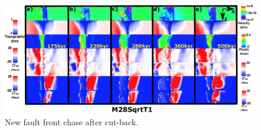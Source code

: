 
\begin{figure}[h]
  \centering
    \includegraphics[width=1.0\textwidth]{./Figures/fig_Results4_9_sqrt_cut_back_new_fault_chase.eps}
  \caption{New fault front chase after cut-back.}
 \label{fig_Results4_9}
\end{figure}

